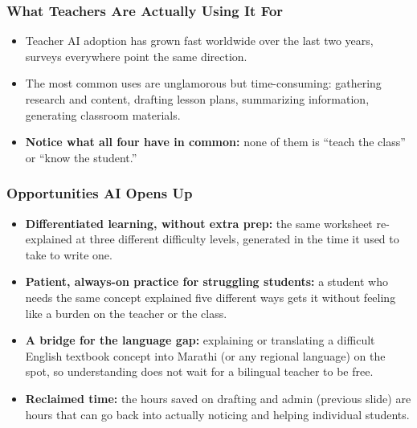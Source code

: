 
\begin{frame}[fragile]\frametitle{What Teachers Are Actually Using It For}
\begin{itemize}
\item Teacher AI adoption has grown fast worldwide over the last two years, surveys everywhere point the same direction.
\item The most common uses are unglamorous but time-consuming: gathering research and content, drafting lesson plans, summarizing information, generating classroom materials.
\item \textbf{Notice what all four have in common:} none of them is ``teach the class'' or ``know the student.''
\end{itemize}
\end{frame}

\begin{frame}[fragile]\frametitle{Opportunities AI Opens Up}
\begin{itemize}
\item \textbf{Differentiated learning, without extra prep:} the same worksheet re-explained at three different difficulty levels, generated in the time it used to take to write one.
\item \textbf{Patient, always-on practice for struggling students:} a student who needs the same concept explained five different ways gets it without feeling like a burden on the teacher or the class.
\item \textbf{A bridge for the language gap:} explaining or translating a difficult English textbook concept into Marathi (or any regional language) on the spot, so understanding does not wait for a bilingual teacher to be free.
\item \textbf{Reclaimed time:} the hours saved on drafting and admin (previous slide) are hours that can go back into actually noticing and helping individual students.
\end{itemize}
\end{frame}

